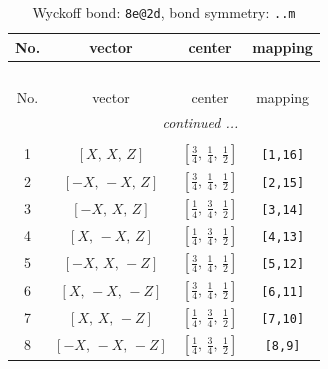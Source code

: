 \documentclass[fleqn,8pt]{jsarticle}
\begin{document}
\begin{longtable}{cccc}
\caption{Wyckoff bond: {\tt 8e@2d}, bond symmetry: {\tt ..m}}
 \\
 \hline \hline
No. & vector & center & mapping \\ \hline \endfirsthead

\multicolumn{3}{l}{\tablename\ \thetable{}} \\
 \hline \hline
No. & vector & center & mapping \\ \hline \endhead

 \hline \hline
\multicolumn{3}{r}{\footnotesize\it continued ...} \\ \endfoot

 \hline \hline
\multicolumn{3}{r}{} \\ \endlastfoot

1 & $\left[ X,\, X,\, Z \right]$ & $\left[ \frac{3}{4},\, \frac{1}{4},\, \frac{1}{2} \right]$ & {\tt [1,16]} \\ \hline
2 & $\left[ - X,\, - X,\, Z \right]$ & $\left[ \frac{3}{4},\, \frac{1}{4},\, \frac{1}{2} \right]$ & {\tt [2,15]} \\ \hline
3 & $\left[ - X,\, X,\, Z \right]$ & $\left[ \frac{1}{4},\, \frac{3}{4},\, \frac{1}{2} \right]$ & {\tt [3,14]} \\ \hline
4 & $\left[ X,\, - X,\, Z \right]$ & $\left[ \frac{1}{4},\, \frac{3}{4},\, \frac{1}{2} \right]$ & {\tt [4,13]} \\ \hline
5 & $\left[ - X,\, X,\, - Z \right]$ & $\left[ \frac{3}{4},\, \frac{1}{4},\, \frac{1}{2} \right]$ & {\tt [5,12]} \\ \hline
6 & $\left[ X,\, - X,\, - Z \right]$ & $\left[ \frac{3}{4},\, \frac{1}{4},\, \frac{1}{2} \right]$ & {\tt [6,11]} \\ \hline
7 & $\left[ X,\, X,\, - Z \right]$ & $\left[ \frac{1}{4},\, \frac{3}{4},\, \frac{1}{2} \right]$ & {\tt [7,10]} \\ \hline
8 & $\left[ - X,\, - X,\, - Z \right]$ & $\left[ \frac{1}{4},\, \frac{3}{4},\, \frac{1}{2} \right]$ & {\tt [8,9]} \\
\end{longtable}
\renewcommand{\arraystretch}{1.2}
\end{document}
